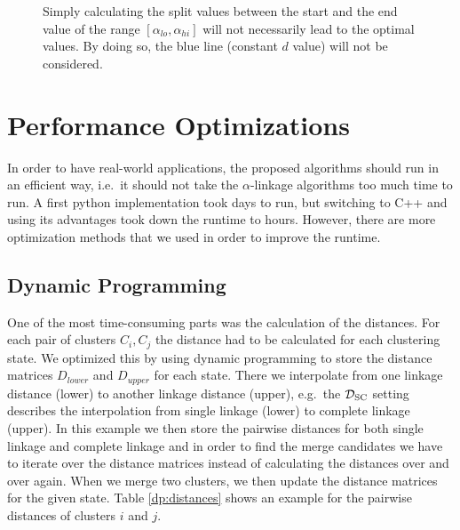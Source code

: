 \begin{figure}
    \centering
    \caption{Simply calculating the split values between the start and the end value of the range $[\alpha_{lo}, \alpha_{hi}]$ will not necessarily lead to the optimal values. By doing so, the blue line (constant $d$ value) will not be considered.}
    \label{fig:optimal}
\end{figure}

\section{Performance Optimizations}

In order to have real-world applications, the proposed algorithms should run in an efficient way, i.e.\ it should not take the $\alpha$-linkage algorithms too much time to run. A first python implementation took days to run, but switching to C++ and using its advantages took down the runtime to hours. However, there are more optimization methods that we used in order to improve the runtime.

\subsection{Dynamic Programming}

One of the most time-consuming parts was the calculation of the distances. For each pair of clusters $C_i, C_j$ the distance had to be calculated for each clustering state. We optimized this by using dynamic programming to store the distance matrices $D_{lower}$ and $D_{upper}$ for each state. There we interpolate from one linkage distance (lower) to another linkage distance (upper), e.g.\ the $\mathcal{D}_\text{SC}$ setting describes the interpolation from single linkage (lower) to complete linkage (upper). In this example we then store the pairwise distances for both single linkage and complete linkage and in order to find the merge candidates we have to iterate over the distance matrices instead of calculating the distances over and over again. When we merge two clusters, we then update the distance matrices for the given state. Table \ref{dp:distances} shows an example for the pairwise distances of clusters $i$ and $j$.

